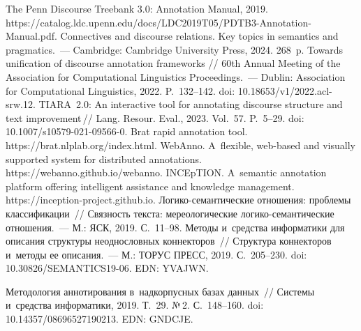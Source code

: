 \begin{multicols}{2}
{{\begin{thebibliography}{99}
 The Penn Discourse Treebank 3.0: Annotation 
Manual, 2019. {\sf https://\linebreak catalog.ldc.upenn.edu/docs/LDC2019T05/PDTB3-Annotation-Manual.pdf}.
 Connectives and discourse relations. Key topics in semantics and 
pragmatics.~--- Cambridge: Cambridge University Press, 2024. 268~p.
 Towards unification of discourse annotation frameworks // 60th 
Annual Meeting of the Association for Computational Linguistics Proceedings.~--- Dublin: Association for 
Computational Linguistics, 2022. P.~132--142. doi: 10.18653/v1/2022.acl-srw.12.
 TIARA~2.0: An interactive tool for 
annotating discourse structure and text improvement\,// Lang. Resour. Eval., 
2023. Vol.~57. P.~5--29. doi: 10.1007/s10579-021-09566-0.
Brat rapid annotation tool. {\sf https://brat.nlplab.org/\linebreak index.html}.
WebAnno. A~flexible, web-based and visually supported system for distributed annotations. {\sf 
https://webanno.\linebreak github.io/webanno}.
INCEpTION. A~semantic annotation platform offering intelligent assistance and knowledge 
management. {\sf https://inception-project.github.io}.
 Ло\-ги\-ко-се\-ман\-ти\-че\-ские отношения: проб\-ле\-мы классификации~// 
Связность текста: мереологические ло\-ги\-ко-се\-ман\-ти\-че\-ские отношения.~--- М.: ЯСК, 2019. 
С.~11--98.
 Методы и~средства информатики для описания 
структуры неоднословных коннекторов~// Структура коннекторов и~методы ее описания.~--- 
М.: ТОРУС ПРЕСС, 2019. С.~205--230. doi: 10.30826/SEMANTICS19-06. EDN: YVAJWN.

 Методология аннотирования 
в~надкорпусных базах данных~// Системы и~средства информатики, 2019. Т.~29. №\,2. С.~148--160.
doi: 10.14357/08696527190213. EDN: GNDCJE.


\end{thebibliography}}}
\end{multicols}
